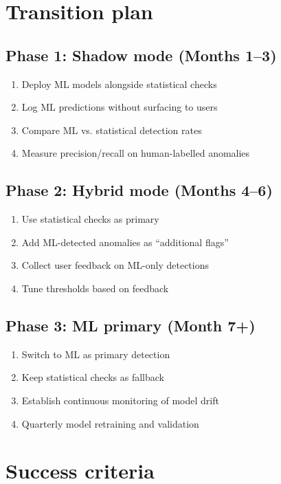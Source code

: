 \section{Transition plan}

\subsection{Phase 1: Shadow mode (Months 1--3)}

\begin{enumerate}
  \item Deploy ML models alongside statistical checks
  \item Log ML predictions without surfacing to users
  \item Compare ML vs. statistical detection rates
  \item Measure precision/recall on human-labelled anomalies
\end{enumerate}

\subsection{Phase 2: Hybrid mode (Months 4--6)}

\begin{enumerate}
  \item Use statistical checks as primary
  \item Add ML-detected anomalies as ``additional flags''
  \item Collect user feedback on ML-only detections
  \item Tune thresholds based on feedback
\end{enumerate}

\subsection{Phase 3: ML primary (Month 7+)}

\begin{enumerate}
  \item Switch to ML as primary detection
  \item Keep statistical checks as fallback
  \item Establish continuous monitoring of model drift
  \item Quarterly model retraining and validation
\end{enumerate}

\section{Success criteria}

